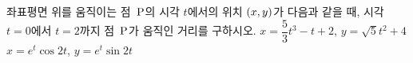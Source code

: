 좌표평면 위를 움직이는 점~$\mathrm{P}$의 시각 $t$에서의 위치 $(x{,}\mkern3mu\mathopen{}y)$가 다음과 같을 때, 시각 $t=0$에서 $t=2$까지 점~$\mathrm{P}$가 움직인 거리를 구하시오.
 $x=\dfrac{5}{3}t^3-t+2$, $y=\sqrt{5}t^2+4$
 $x=e^t\cos 2t$, $y=e^t\sin 2t$
